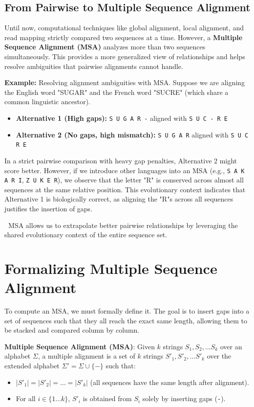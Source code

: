 \documentclass[11pt, a4paper]{article}
\newcommand{\sta}{\textbf{\sffamily [CRITICAL / EXAM]\ }}
\newenvironment{important}
  {\begin{tcolorbox}[colback=blue!5!white, colframe=blue!75!black, arc=1mm, boxrule=1pt]}
  {\end{tcolorbox}}
\begin{document}
\subsection{From Pairwise to Multiple Sequence Alignment}

Until now, computational techniques like global alignment, local alignment, and read mapping strictly compared two sequences at a time. However, a \textbf{Multiple Sequence Alignment (MSA)} analyzes more than two sequences simultaneously. This provides a more generalized view of relationships and helps resolve ambiguities that pairwise alignments cannot handle.

\textbf{Example:} Resolving alignment ambiguities with MSA.
Suppose we are aligning the English word "SUGAR" and the French word "SUCRE" (which share a common linguistic ancestor).
\begin{itemize}
    \item \textbf{Alternative 1 (High gaps):} \texttt{S U G A R -} aligned with \texttt{S U C - R E}
    \item \textbf{Alternative 2 (No gaps, high mismatch):} \texttt{S U G A R} aligned with \texttt{S U C R E}
\end{itemize}
In a strict pairwise comparison with heavy gap penalties, Alternative 2 might score better. However, if we introduce other languages into an MSA (e.g., \texttt{S A K A R I}, \texttt{Z U K E R}), we observe that the letter "R" is conserved across almost all sequences at the same relative position. This evolutionary context indicates that Alternative 1 is biologically correct, as aligning the "R"s across all sequences justifies the insertion of gaps.

\sta MSA allows us to extrapolate better pairwise relationships by leveraging the shared evolutionary context of the entire sequence set.

\section{Formalizing Multiple Sequence Alignment}

To compute an MSA, we must formally define it. The goal is to insert gaps into a set of sequences such that they all reach the exact same length, allowing them to be stacked and compared column by column.

\begin{important}
  \textbf{Multiple Sequence Alignment (MSA)}: Given $k$ strings $S_1, S_2, \dots S_k$ over an alphabet $\Sigma$, a multiple alignment is a set of $k$ strings $S'_1, S'_2, \dots S'_k$ over the extended alphabet $\Sigma' = \Sigma \cup \{-\}$ such that:
  \begin{itemize}
      \item $|S'_1| = |S'_2| = \dots = |S'_k|$ (all sequences have the same length after alignment).
      \item For all $i \in \{1 \dots k\}$, $S'_i$ is obtained from $S_i$ solely by inserting gaps (\texttt{-}).
  \end{itemize}
\end{important}
\end{document}
